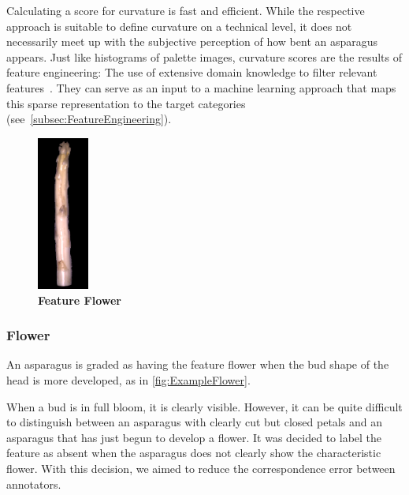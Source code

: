 \bigskip
Calculating a score for curvature is fast and efficient. While the respective approach is suitable to define curvature on a technical level, it does not necessarily meet up with the subjective perception of how bent an asparagus appears. Just like histograms of palette images, curvature scores are the results of feature engineering: The use of extensive domain knowledge to filter relevant features~\citep{zheng2018feature}. They can serve as an input to a machine learning approach that maps this sparse representation to the target categories (see~\autoref{subsec:FeatureEngineering}).

\begin{figure}
  \begin{center}
    \includegraphics[width=0.15\textwidth]{Figures/chapter03/example_img_flower.png}
  \end{center}
  \vspace{-15pt}
  \caption[Example Image Feature Flower]{ \textbf{Feature Flower}}
  \label{fig:ExampleFlower}
\end{figure}

\subsubsection{Flower}
\label{subsec:Flower}

An asparagus is graded as having the feature flower when the bud shape of the head is more developed, as in \autoref{fig:ExampleFlower}.

When a bud is in full bloom, it is clearly visible. However, it can be quite difficult to distinguish between an asparagus with clearly cut but closed petals and an asparagus that has just begun to develop a flower. It was decided to label the feature as absent when the asparagus does not clearly show the characteristic flower. With this decision, we aimed to reduce the correspondence error between annotators.

